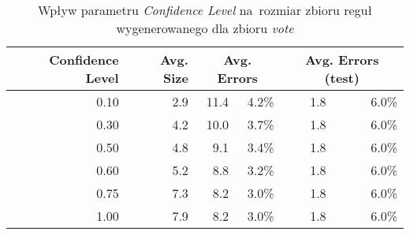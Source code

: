 \begin{table}
\begin{tabular}{|r|r|rr|rr|}
\hline
 Confidence Level & 
 Avg. Size & 
 \multicolumn{2}{|c|}{Avg. Errors} & 
 \multicolumn{2}{|c|}{Avg. Errors (test)} \\
\hline\hline
      0.10 &    2.9 &   11.4 & 4.2\% &    1.8 &  6.0\% \\
      0.30 &    4.2 &   10.0 & 3.7\% &    1.8 &  6.0\% \\
      0.50 &    4.8 &    9.1 & 3.4\% &    1.8 &  6.0\% \\
      0.60 &    5.2 &    8.8 & 3.2\% &    1.8 &  6.0\% \\      
      0.75 &    7.3 &    8.2 & 3.0\% &    1.8 &  6.0\% \\
      1.00 &    7.9 &    8.2 & 3.0\% &    1.8 &  6.0\% \\
\hline
\end{tabular}
\caption{Wpływ parametru \emph{Confidence Level} na~rozmiar zbioru reguł wygenerowanego dla zbioru \emph{vote}}
\label{p2t2-vote-confidence-level}
\end{table}
